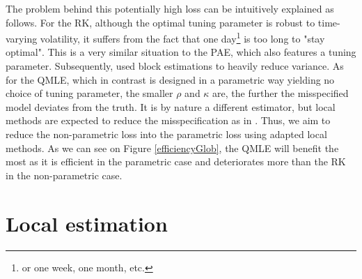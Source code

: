 \documentclass[11pt]{article}
\numberwithin{equation}{section}
\theoremstyle{plain}
\theoremstyle{remark}
\begin{document}
\smallskip
The problem behind this potentially high loss can be intuitively explained as follows. For the RK, although the optimal tuning parameter is robust to time-varying volatility, it suffers from the fact that one day\footnote{or one week, one month, etc.} is too long to "stay optimal". This is a very similar situation to the PAE, which also features a tuning parameter. Subsequently, \cite{jacod2015microstructure} used block estimations to heavily reduce variance. As for the QMLE, which in contrast is designed in a parametric way yielding no choice of tuning parameter, the smaller $\rho$ and $\kappa$ are, the further the misspecified model deviates from the truth. It is by nature a different estimator, but local methods are expected to reduce the misspecification as in \cite{reiss2011asymptotic}. Thus, we aim to reduce the non-parametric loss into the parametric loss using adapted local methods. As we can see on Figure \ref{efficiencyGlob}, the QMLE will benefit the most as it is efficient in the parametric case and deteriorates more than the RK in the non-parametric case.

\section{Local estimation}
\end{document}

